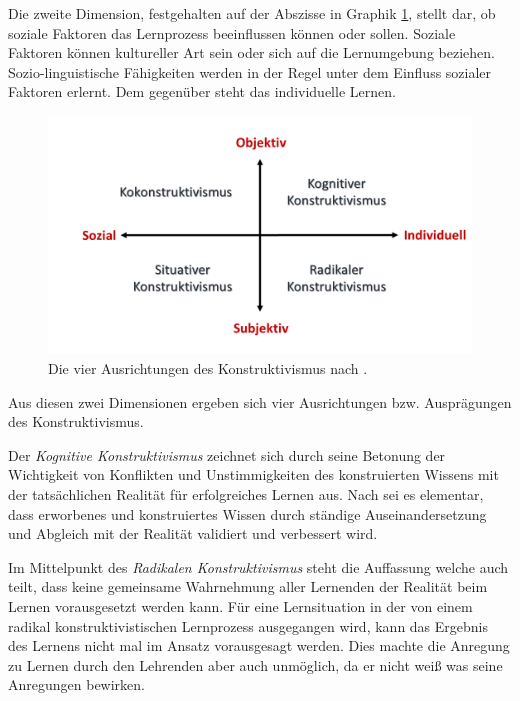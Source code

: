 Die zweite Dimension, festgehalten auf der Abszisse in Graphik \ref{fig:Anderson.1999_4positions}, stellt dar, ob soziale Faktoren das Lernprozess beeinflussen können oder sollen. Soziale Faktoren können kultureller Art sein oder sich auf die Lernumgebung beziehen. Sozio-linguistische Fähigkeiten werden in der Regel unter dem Einfluss sozialer Faktoren erlernt. Dem gegenüber steht das individuelle Lernen. \cite{Anderson.1999}

\begin{figure}
	\centering
	\includegraphics[width=1\textwidth]{Abbildungen/Anderson_1999_4positions.png}
	\caption{Die vier Ausrichtungen des Konstruktivismus nach \cite{Anderson.1999}.}
	\label{fig:Anderson.1999_4positions}
\end{figure}

Aus diesen zwei Dimensionen ergeben sich vier Ausrichtungen bzw. Ausprägungen des Konstruktivismus. 

Der \emph{Kognitive Konstruktivismus} zeichnet sich durch seine Betonung der Wichtigkeit von Konflikten und Unstimmigkeiten des konstruierten Wissens mit der tatsächlichen Realität für erfolgreiches Lernen aus. Nach \cite{Tobias.1991} sei es elementar, dass erworbenes und konstruiertes Wissen durch ständige Auseinandersetzung und Abgleich mit der Realität validiert und verbessert wird. 

Im Mittelpunkt des \emph{Radikalen Konstruktivismus} \label{par:konstr_pos_rad} steht die Auffassung welche auch \cite{Suchman.1987} teilt, dass keine gemeinsame Wahrnehmung aller Lernenden der Realität beim Lernen vorausgesetzt werden kann. Für eine Lernsituation in der von einem radikal konstruktivistischen Lernprozess ausgegangen wird, kann das Ergebnis des Lernens nicht mal im Ansatz vorausgesagt werden. Dies machte die Anregung zu Lernen durch den Lehrenden aber auch unmöglich, da er nicht weiß was seine Anregungen bewirken. \cite{Anderson.1999}

